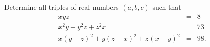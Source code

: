 Determine all triples of real numbers $(a,b,c)$ such that \begin{eqnarray*} xyz &=& 8 \\ x^2y + y^2z + z^2x &=& 73 \\ x(y-z)^2 + y(z-x)^2 + z(x-y)^2 &=& 98 . \end{eqnarray*}